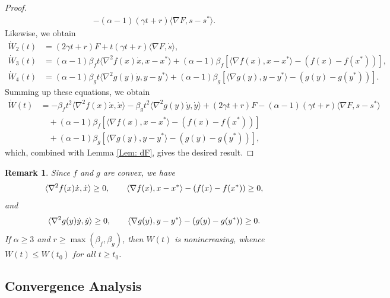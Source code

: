\documentclass[pdflatex,sn-mathphys-num]{sn-jnl}
\theoremstyle{thmstyleone}
\theoremstyle{thmstyletwo}
\newtheorem{remark}[theorem]{Remark}
\theoremstyle{thmstylethree}
\newcommand{\qbox}[1]{\quad\hbox{#1}\quad}
\begin{document}
\begin{proof}
\begin{align*}
   - (\alpha-1)(\gamma t + r) \langle \nabla F, s-s^* \rangle. 
\end{align*}
Likewise, we obtain
\begin{align*}
\dot{W}_2(t) &= (2\gamma t + r) F + t(\gamma t + r)\langle \nabla F, \dot{s} \rangle,\\
\dot{W}_3(t) &= (\alpha-1)\beta_f t \langle \nabla^2 f(x) \dot{x}, x-x^* \rangle 
 + (\alpha-1)\beta_f \left[\langle \nabla f(x), x-x^* \rangle - \left( f(x) - f(x^*) \right) \right],\\
\dot{W}_4(t) &= (\alpha-1)\beta_g t \langle \nabla^2 g(y)\dot{y}, y-y^* \rangle 
 + (\alpha-1)\beta_g \left[ \langle \nabla g(y), y-y^* \rangle - \left( g(y) - g(y^*) \right) \right]. 
\end{align*}
Summing up these equations, we obtain
\begin{align*}
\dot{W}(t)
&= - \beta_f t^2 \langle \nabla^2 f(x)\dot{x}, \dot{x} \rangle
   - \beta_g t^2 \langle \nabla^2 g(y)\dot{y}, \dot{y} \rangle 
   + (2\gamma t + r) F 
 - (\alpha-1)(\gamma t + r) \langle \nabla F, s-s^* \rangle \\
&\quad + (\alpha-1)\beta_f \left[\langle \nabla f(x), x-x^* \rangle - \left( f(x) - f(x^*) \right) \right] \\
&\quad + (\alpha-1)\beta_g \left[ \langle \nabla g(y), y-y^* \rangle - \left( g(y) - g(y^*) \right) \right],
\end{align*}
which, combined with Lemma \ref{Lem: dF}, gives the desired result.
\end{proof}


\begin{remark}\label{Rem: W_bound_AVD}
Since $f$ and $g$ are convex, we have
$$\langle \nabla^2 f(x)\dot{x}, \dot{x} \rangle \ge 0, \qbox{} \langle \nabla f(x), x-x^* \rangle - \left( f(x) - f(x^*) \right) \ge 0, $$
and
$$\langle \nabla^2 g(y)\dot{y}, \dot{y} \rangle\ge 0, \qbox{} \langle \nabla g(y), y-y^* \rangle - \left( g(y) - g(y^*) \right) \ge 0. $$
If $\alpha\ge 3$ and $r\ge\max(\beta_f,\beta_g)$, then $W(t)$ is nonincreasing, whence $W(t)\le W(t_0)$ for all $t\ge t_0$.
\end{remark}




\subsection{Convergence Analysis}\label{Subsec: convergence_analysis_PD_AVD-H}
\end{document}
